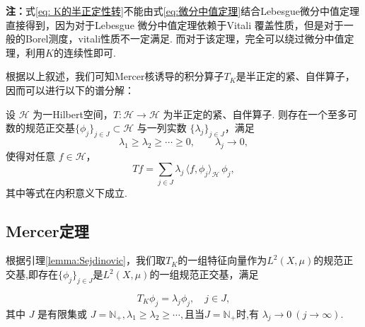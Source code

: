 \documentclass[../master.tex]{subfiles}
\begin{document}
\textbf{注：}式\eqref{eq: K的半正定性转}不能由式\eqref{eq:微分中值定理}结合Lebesgue微分中值定理直接得到，因为对于Lebesgue 微分中值定理依赖于Vitali 覆盖性质，但是对于一般的Borel测度，vitali性质不一定满足. 而对于该定理，完全可以绕过微分中值定理，利用$K$的连续性即可.


根据以上叙述，我们可知Mercer核诱导的积分算子$T_K$是半正定的紧、自伴算子，因而可以进行以下的谱分解：
\begin{lemma}\label{lemma:Sejdinovic}
设 $\mathcal{H}$ 为一Hilbert空间，$T:\mathcal{H}\to\mathcal{H}$ 为半正定的紧、自伴算子.
则存在一个至多可数的规范正交基$\{\phi_j\}_{j\in J}\subset\mathcal{H}$ 与一列实数
$\{\lambda_j\}_{j\in J}$，满足
\[
\lambda_1\ge \lambda_2\ge \cdots \geq  0,\qquad \lambda_j\to 0,
\]
使得对任意 $f\in\mathcal{H}$，
\[
Tf=\sum_{j\in J}\lambda_j\,\langle f,\phi_j\rangle_{\mathcal{H}}\,\phi_j ,
\]
其中等式在内积意义下成立.
\end{lemma}


\subsection{Mercer定理}
根据引理\ref{lemma:Sejdinovic}，我们取$T_K$的一组特征向量作为$L^2(X,\mu)$的规范正交基,即存在$\{\phi_j\}_{j\in J}$是$L^2(X,\mu)$的一组规范正交基，满足

$$T_K\phi_j=\lambda_j\phi_j,\quad j\in J,$$
其中 $J$ 是有限集或 $J=\mathbb{N}_+,\lambda_1\geq\lambda_2\geq\cdots,$且当$J=\mathbb{N}_+$时,有 $\lambda_j\to0~(j\to\infty).$
\end{document}
